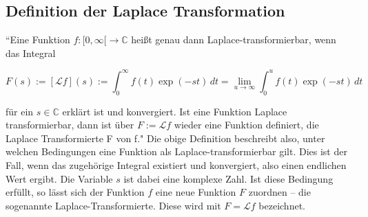 \addvspace{1cm}
\subsection{Definition der Laplace Transformation}

``Eine Funktion $f \colon [0, \infty[ \to \mathbb{C}$ heißt genau dann Laplace-transformierbar, wenn das Integral

\begin{equation}
    F(s) := [\mathcal{L}f](s) := \int_{0}^{\infty} f(t) \exp(-st) \, dt 
    = \lim_{u \to \infty} \int_{0}^{u} f(t) \exp(-st) \, dt
    \label{eq:laplace_def}
    \end{equation}

für ein $s \in \mathbb{C}$ erklärt ist und konvergiert. Ist eine Funktion Laplace transformierbar, dann ist über $F := \mathcal{L}f$ wieder eine Funktion definiert, die Laplace Transformierte F von f." \cite[S. 879]{buch1}
Die obige Definition beschreibt also, unter welchen Bedingungen eine Funktion als Laplace-transformierbar gilt. Dies ist der Fall, wenn das zugehörige Integral existiert und konvergiert, also einen endlichen Wert ergibt. Die Variable $s$ ist dabei eine komplexe Zahl. Ist diese Bedingung erfüllt, so lässt sich der Funktion $f$ eine neue Funktion $F$ zuordnen – die sogenannte Laplace-Transformierte. Diese wird mit $F = \mathcal{L}f$ bezeichnet. \cite[S.~879]{buch1}